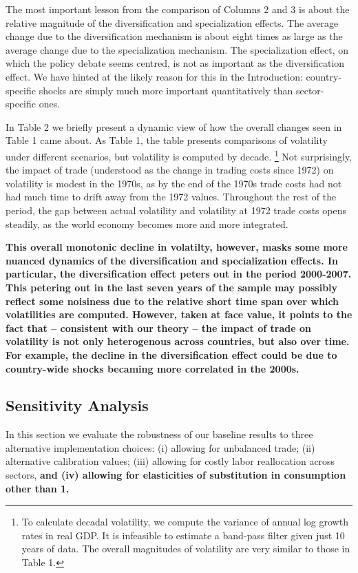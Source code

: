 \documentclass[12pt]{article}
\begin{document}
The most important lesson from the comparison of Columns 2 and 3 is about
the relative magnitude of the diversification and specialization effects.
The average change due to the diversification mechanism is about eight times
as large as the average change due to the specialization mechanism. The
specialization effect, on which the policy debate seems centred, is not as
important as the diversification effect. We have hinted at the likely reason
for this in the Introduction: country-specific shocks are simply much more
important quantitatively than sector-specific ones.

In Table 2 we briefly present a dynamic view of how the overall changes seen
in Table 1 came about. As Table 1, the table presents comparisons of
volatility under different scenarios, but volatility is computed by decade.%
\footnote{%
To calculate decadal volatility, we compute the variance of annual log
growth rates in real GDP. It is infeasible to estimate a band-pass filter
given just 10 years of data. The overall magnitudes of volatility are very
similar to those in Table 1.} Not surprisingly, the impact of trade
(understood as the change in trading costs since 1972) on volatility is
modest in the 1970s, as by the end of the 1970s trade costs had not had much
time to drift away from the 1972 values. Throughout the rest of the period,
the gap between actual volatility and volatility at 1972 trade costs opens
steadily, as the world economy becomes more and more integrated.

\textbf{This overall monotonic decline in volatilty, however, masks some
more nuanced dynamics of the diversification and specialization effects. In
particular, the diversification effect peters out in the period 2000-2007.
This petering out in the last seven years of the sample may possibly reflect
some noisiness due to the relative short time span over which volatilities
are computed. However, taken at face value, it points to the fact that --
consistent with our theory -- the impact of trade on volatility is not only
heterogenous across countries, but also over time. For example, the decline
in the diversification effect could be due to country-wide shocks becaming
more correlated in the 2000s.}

\subsection{Sensitivity Analysis}

In this section we evaluate the robustness of our baseline results to three
alternative implementation choices: (i) allowing for unbalanced trade; (ii)
alternative calibration values; (iii) allowing for costly labor reallocation
across sectors, \textbf{and (iv) allowing for elasticities of substitution
in consumption other than 1.}
\end{document}
